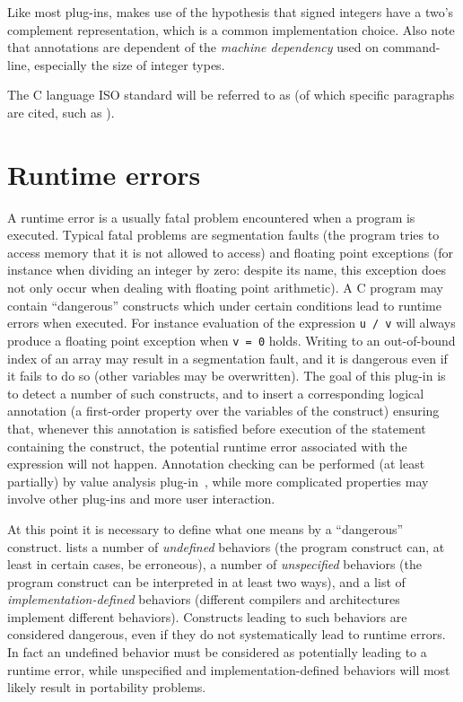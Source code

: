 Like most \framac{} plug-ins, \rte{} makes use of the hypothesis that signed
integers have a two's complement representation, which is a common
implementation choice.  Also note that annotations are dependent of the {\it
  machine dependency} used on \framac{} command-line, especially the size of
integer types.

The C language ISO standard \cite{standardc23} will be referred to as \cnn{}
(of which specific paragraphs are cited, such as ).

\section{Runtime errors}

A runtime error is a usually fatal problem encountered when a program is
executed.  Typical fatal problems are segmentation faults (the program tries to
access memory that it is not allowed to access) and floating point exceptions
(for instance when dividing an integer by zero: despite its name, this exception
does not only occur when dealing with floating point arithmetic).  A C program
may contain ``dangerous'' constructs which under certain conditions lead to
runtime errors when executed.  For instance evaluation of the expression
\lstinline|u / v| will always produce a floating point exception when
\lstinline|v = 0| holds.  Writing to an out-of-bound index of an array may
result in a segmentation fault, and it is dangerous even if it fails to do so
(other variables may be overwritten).  The goal of this \framac{} plug-in is to
detect a number of such constructs, and to insert a corresponding logical
annotation (a first-order property over the variables of the construct) ensuring
that, whenever this annotation is satisfied before execution of the statement
containing the construct, the potential runtime error associated with the
expression will not happen.  Annotation checking can be performed (at least
partially) by \framac{} value analysis plug-in~\cite{framacvalueanalysis}, while
more complicated properties may involve other plug-ins and more user
interaction.

At this point it is necessary to define what one means by a ``dangerous''
construct.  \cnn{} lists a number of {\it undefined} behaviors (the program
construct can, at least in certain cases, be erroneous), a number of {\it
  unspecified} behaviors (the program construct can be interpreted in at least
two ways), and a list of {\it implementation-defined} behaviors (different
compilers and architectures implement different behaviors).  Constructs leading
to such behaviors are considered dangerous, even if they do not systematically
lead to runtime errors.  In fact an undefined behavior must be considered as
potentially leading to a runtime error, while unspecified and
implementation-defined behaviors will most likely result in portability
problems.

